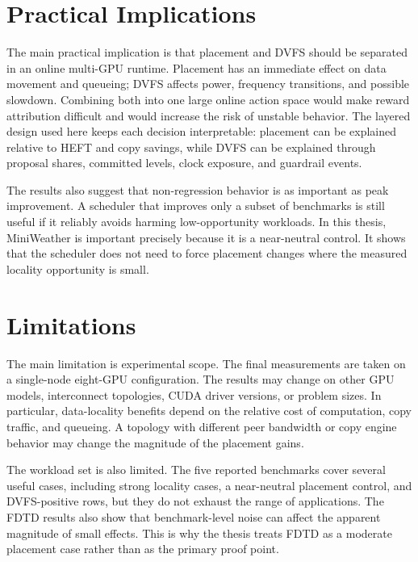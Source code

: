 \section{Practical Implications}
\label{sec:discussion-practical-implications}

The main practical implication is that placement and DVFS should be separated
in an online multi-GPU runtime. Placement has an immediate effect on data
movement and queueing; DVFS affects power, frequency transitions, and possible
slowdown. Combining both into one large online action space would make reward
attribution difficult and would increase the risk of unstable behavior. The
layered design used here keeps each decision interpretable: placement can be
explained relative to HEFT and copy savings, while DVFS can be explained
through proposal shares, committed levels, clock exposure, and guardrail
events.

The results also suggest that non-regression behavior is as important as peak
improvement. A scheduler that improves only a subset of benchmarks is still
useful if it reliably avoids harming low-opportunity workloads. In this thesis,
MiniWeather is important precisely because it is a near-neutral control. It
shows that the scheduler does not need to force placement changes where the
measured locality opportunity is small.

\section{Limitations}
\label{sec:discussion-limitations}

The main limitation is experimental scope. The final measurements are taken on
a single-node eight-GPU configuration. The results may change on other GPU
models, interconnect topologies, CUDA driver versions, or problem sizes. In
particular, data-locality benefits depend on the relative cost of computation,
copy traffic, and queueing. A topology with different peer bandwidth or copy
engine behavior may change the magnitude of the placement gains.

The workload set is also limited. The five reported benchmarks cover several
useful cases, including strong locality cases, a near-neutral placement
control, and DVFS-positive rows, but they do not exhaust the range of \CUDASTF{}
applications. The FDTD results also show that benchmark-level noise can affect
the apparent magnitude of small effects. This is why the thesis treats FDTD as
a moderate placement case rather than as the primary proof point.

